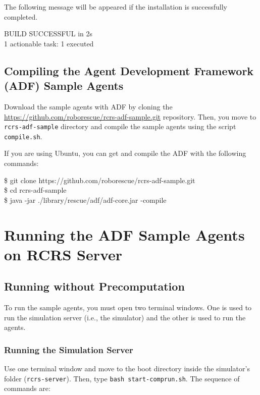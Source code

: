 \documentclass{article}
\begin{document}
The following message will be appeared if the installation is successfully completed.

\begin{center}
  \begin{tcolorbox}[title=Install Completion, width=.98\linewidth]
  {\ttfamily
  BUILD SUCCESSFUL in 2s\\
  1 actionable task: 1 executed
  }
  \end{tcolorbox}
\end{center}
\subsection{Compiling the Agent Development Framework (ADF) Sample Agents}
Download the sample agents with ADF by cloning the \url{https://github.com/roborescue/rcrs-adf-sample.git} repository. Then, you move to \texttt{rcrs-adf-sample} directory and compile the sample agents using the
script \texttt{compile.sh}.

If you are using Ubuntu, you can get and compile the ADF with the following commands:

\begin{center}
  \begin{tcolorbox}[title=Download ADF on Ubuntu, width=.98\linewidth]
  {\ttfamily\small
  \$ git clone https://github.com/roborescue/rcrs-adf-sample.git\\
   \$ cd rcrs-adf-sample\\
   \$ java -jar ./library/rescue/adf/adf-core.jar -compile
  }
  \end{tcolorbox}
\end{center}
\section{Running the ADF Sample Agents on RCRS Server}
\subsection{Running without Precomputation}
To run the sample agents, you must open two terminal windows. One is used to run the simulation server (i.e., the simulator) and the other is used to run the agents.
\subsubsection{Running the Simulation Server}
Use one terminal window and move to the boot directory inside the simulator's folder (\texttt{rcrs-server}). Then, type \texttt{bash start-comprun.sh}. The sequence of commands are:
\end{document}
